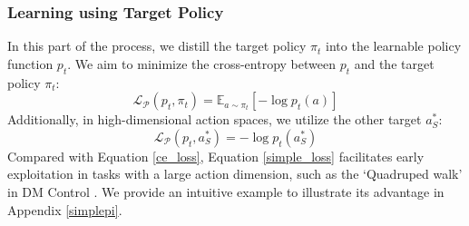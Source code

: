 





\subsubsection{Learning using Target Policy}
In this part of the process, we distill the target policy \( \pi_t \) into the learnable policy function \( p_t \). We aim to minimize the cross-entropy between \( p_t \) and the target policy \( \pi_t \):
\begin{equation}
\label{ce_loss}
    \mathcal{L}_{\mathcal{P}}(p_t, \pi_t) = \mathbb{E}_{a \sim \pi_t}\left[-\log p_t (a) \right]
\end{equation}
Additionally, in high-dimensional action spaces, we utilize the other target \( a^*_S \):
\begin{equation}
    \label{simple_loss}
    \mathcal{L}_{\mathcal{P}}(p_t, a^*_{S})=-\log p_t\left(a^*_{S}\right)
\end{equation}
Compared with Equation \eqref{ce_loss}, Equation \eqref{simple_loss} facilitates early exploitation in tasks with a large action dimension, such as the `Quadruped walk' in DM Control \citep{tassa2018deepmind}. We provide an intuitive example to illustrate its advantage in Appendix \ref{simplepi}.


